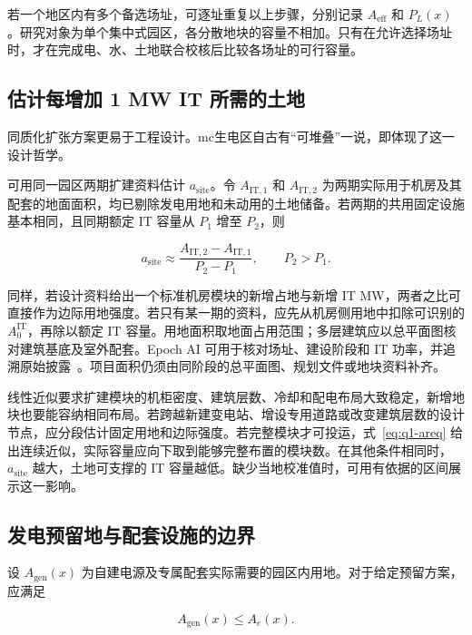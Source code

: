 若一个地区内有多个备选场址，可逐址重复以上步骤，分别记录 $A_{\mathrm{eff}}$ 和 $P_L(x)$。研究对象为单个集中式园区，各分散地块的容量不相加。只有在允许选择场址时，才在完成电、水、土地联合校核后比较各场址的可行容量。

\subsection{估计每增加 1 MW IT 所需的土地}\label{apx:c2}

同质化扩张方案更易于工程设计。mc生电区自古有“可堆叠”一说，即体现了这一设计哲学。

可用同一园区两期扩建资料估计 $a_{\mathrm{site}}$。令 $A_{\mathrm{IT},1}$ 和 $A_{\mathrm{IT},2}$ 为两期实际用于机房及其配套的地面面积，均已剔除发电用地和未动用的土地储备。若两期的共用固定设施基本相同，且同期额定 IT 容量从 $P_1$ 增至 $P_2$，则

\begin{equation}\label{eq:apxC-site}
a_{\mathrm{site}}\approx
\frac{A_{\mathrm{IT},2}-A_{\mathrm{IT},1}}{P_2-P_1},
\qquad P_2>P_1 .
\end{equation}

同样，若设计资料给出一个标准机房模块的新增占地与新增 IT MW，两者之比可直接作为边际用地强度。若只有某一期的资料，应先从机房侧用地中扣除可识别的 $A_0^{\mathrm{IT}}$，再除以额定 IT 容量。用地面积取地面占用范围；多层建筑应以总平面图核对建筑基底及室外配套。Epoch AI 可用于核对场址、建设阶段和 IT 功率，并追溯原始披露~\cite{apxrefL02}。项目面积仍须由同阶段的总平面图、规划文件或地块资料补齐。

线性近似要求扩建模块的机柜密度、建筑层数、冷却和配电布局大致稳定，新增地块也要能容纳相同布局。若跨越新建变电站、增设专用道路或改变建筑层数的设计节点，应分段估计固定用地和边际强度。若完整模块才可投运，式~\eqref{eq:q1-areq} 给出连续近似，实际容量应向下取到能够完整布置的模块数。在其他条件相同时，$a_{\mathrm{site}}$ 越大，土地可支撑的 IT 容量越低。缺少当地校准值时，可用有依据的区间展示这一影响。

\subsection{发电预留地与配套设施的边界}\label{apx:c3}

设 $A_{\mathrm{gen}}(x)$ 为自建电源及专属配套实际需要的园区内用地。对于给定预留方案，应满足

\begin{equation}\label{eq:apxC-gen}
A_{\mathrm{gen}}(x)\le A_e(x).
\end{equation}

